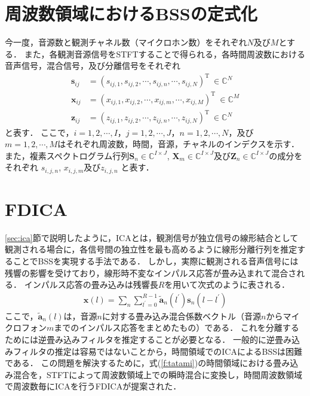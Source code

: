 \section{周波数領域におけるBSSの定式化}
\label{sec:formularization}
今一度，音源数と観測チャネル数（マイクロホン数）をそれぞれ$N$及び$M$とする．
また，各観測音源信号をSTFTすることで得られる，各時間周波数における音声信号，混合信号，及び分離信号をそれぞれ
\begin{align}
  \bm{s}_{ij} &= \left(
	s_{ij,1},s_{ij,2}, \cdots, s_{ij,n}, \cdots, s_{ij,N} 
  \right)^\mathrm{T}~\in \mathbb{C}^{N}\\
  \bm{x}_{ij} &= \left(
      x_{ij,1},x_{ij,2},  \cdots, x_{ij,m}, \cdots  , x_{ij,M} 
  \right)^\mathrm{T}~\in \mathbb{C}^{M} \\
  \bm{z}_{ij} &= \left(
      z_{ij,1},z_{ij,2},  \cdots, z_{ij,n}, \cdots  , z_{ij,N} 
  \right)^\mathrm{T}~\in \mathbb{C}^{N}
\end{align}
と表す．
ここで，$i= 1, 2, \cdots , I$，$j = 1, 2, \cdots , J$，$n = 1, 2, \cdots , N$，及び$m =
1, 2, \cdots , M $はそれぞれ周波数，時間，音源，チャネルのインデクスを示す．
また，複素スペクトログラム行列$\bm{S}_{n} \in \mathbb{C}^{I\times J}$, $\bm{X}_{m} \in \mathbb{C}^{I\times J}$及び$\bm{Z}_{n} \in \mathbb{C}^{I\times J}$の成分をそれぞれ
$s_{i, j, n}$, $x_{i, j, m}$及び$z_{i, j, n}$ と表す．

\section{FDICA}
\label{sec:fdica}
\ref{sec:ica}節で説明したように，ICAとは，観測信号が独立信号の線形結合として観測される場合に，各信号間の独立性を最も高めるように線形分離行列を推定することでBSSを実現する手法である．
しかし，実際に観測される音声信号には残響の影響を受けており，線形時不変なインパルス応答が畳み込まれて混合される．
インパルス応答の畳み込みは残響長$R$を用いて次式のように表される．
\begin{align}
  \bm{x}(l) = \sum_n \sum_{l^{'}=0}^{R-1} \tilde{\bm{a}}_n(l^{'}) \bm{s}_n(l-l^{'})
  \label{f:tatami}
\end{align}
ここで，$\tilde{\bm{a}}_n(l)$は，音源$n$に対する畳み込み混合係数ベクトル（音源$n$からマイクロフォン$m$までのインパルス応答をまとめたもの）である．
これを分離するためには逆畳み込みフィルタを推定することが必要となる．
一般的に逆畳み込みフィルタの推定は容易ではないことから，時間領域でのICAによるBSSは困難である．
この問題を解決するために，式(\ref{f:tatami})の時間領域における畳み込み混合を，STFTによって周波数領域上での瞬時混合に変換し，時間周波数領域で周波数毎にICAを行うFDICAが提案された．

